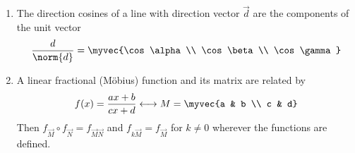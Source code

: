 \begin{enumerate}[label=\thesubsection.\arabic*, ref=\thesubsection.\theenumi]
\begin{align}
	\text{Area} = \norm{\vec{a}}\norm{\vec{b}}\sin\theta
\end{align}
Expanding the components in \eqref{eq:EE26BTECH11205-cross-comp} gives $\norm{\vec{a}\times\vec{b}}^2 = \norm{\vec{a}}^2\norm{\vec{b}}^2 - \brak{\vec{a}^{\top}\vec{b}}^2$, and $\vec{a}^{\top}\vec{b} = \norm{\vec{a}}\norm{\vec{b}}\cos\theta$, so
\begin{align}
	\norm{\vec{a}\times\vec{b}}^2 &= \norm{\vec{a}}^2\norm{\vec{b}}^2\brak{1-\cos^2\theta} \notag
	\\
	&= \brak{\norm{\vec{a}}\norm{\vec{b}}\sin\theta}^2
\end{align}
Since $\sin\theta \ge 0$ for $0 \le \theta \le \pi$, taking square roots gives \eqref{eq:EE26BTECH11205-area-cross}.

\item The direction cosines of a line with direction vector $\vec{d}$ are the components of the unit vector
\begin{align}
	\frac{\vec{d}}{\norm{\vec{d}}} = \myvec{\cos\alpha \\ \cos\beta \\ \cos\gamma} \label{eq:EE26BTECH11205-dircos}
\end{align}
\item A linear fractional (M\"obius) function and its matrix are related by
\begin{align}
	f(x) = \frac{ax+b}{cx+d} \longleftrightarrow \vec{M} = \myvec{a & b \\ c & d} \label{eq:EE26BTECH11205-mobius}
\end{align}
Then $f_{\vec{M}}\circ f_{\vec{N}} = f_{\vec{M}\vec{N}}$ and $f_{k\vec{M}} = f_{\vec{M}}$ for $k \neq 0$ wherever the functions are defined.


\end{enumerate}
